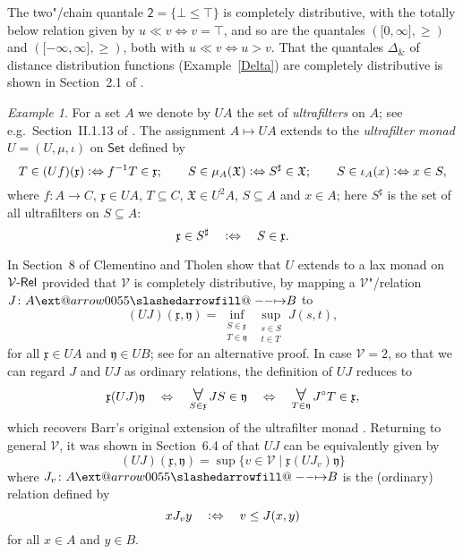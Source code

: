 \documentclass[preprint, a4paper]{elsarticle}
\makeatletter
\def\slashedarrowfill@#1#2#3#4#5{%
  $\m@th\thickmuskip0mu\medmuskip\thickmuskip\thinmuskip\thickmuskip
   \relax#5#1\mkern-7mu%
   \cleaders\hbox{$#5\mkern-2mu#2\mkern-2mu$}\hfill
   \mathclap{#3}\mathclap{#2}%
   \cleaders\hbox{$#5\mkern-2mu#2\mkern-2mu$}\hfill
   \mkern-7mu#4$%
}
\def\rightslashedarrowfill@{%
  \slashedarrowfill@\relbar\relbar\mapstochar\rightarrow}
\newcommand\xslashedrightarrow[2][]{%
  \ext@arrow 0055{\rightslashedarrowfill@}{#1}{#2}}
\def\slashedrightarrow{\xslashedrightarrow{}}
\theoremstyle{definition}
\theoremstyle{remark}
\newtheorem{example}[theorem]{Example}
\providecommand{\exref}[1]{Example~\ref{#1}}
\newcommand\defeq{\mathrel{\vcentcolon\Leftrightarrow}}
\renewcommand{\iff}{\Leftrightarrow}
\providecommand{\mf}[1]{\mathfrak{#1}}
\providecommand{\brcs}[1]{\lbrace #1 \rbrace}
\providecommand{\brks}[1]{\lbrack #1 \rbrack}
\providecommand{\set}[1]{\brcs{#1}}
\DeclareMathOperator\ForallOp{\mbox{\Large $\mathsurround0pt\forall$}}
\newcommand\Forall{\ForallOp\displaylimits}
\providecommand{\rev}[1]{#1^\circ}
\newcommand{\tn}{\mathbin\&}
\providecommand{\map}[3]{#1\colon#2\to#3}
\providecommand{\hmap}[3]{#1\colon#2\slashedrightarrow#3}
\providecommand{\inv}[1]{{#1}^{-1}}
\providecommand{\catvar}[1]{\mathcal{#1}}
\providecommand{\2}{\mathsf 2}
\providecommand{\V}{\catvar V}
\providecommand{\Set}{\mathsf{Set}}
\providecommand{\Rel}{\mathsf{Rel}}
\providecommand{\enRel}[1]{#1\text-\Rel}
\makeatother
\begin{document}
The two"/chain quantale $\2 = \set{\bot \leq \top}$ is completely distributive, with the totally below relation given by $u \ll v \iff v = \top$, and so are the quantales $(\brks{0, \infty}, \geq)$ and $(\brks{-\infty, \infty}, \geq)$, both with $u \ll v \iff u > v$. That the quantales $\Delta_{\tn}$ of distance distribution functions (\exref{Delta}) are completely distributive is shown in Section~2.1 of \cite{Hofmann-Reis13}.
	\begin{example} \label{ultrafilter monad}
		For a set $A$ we denote by $UA$ the set of \emph{ultrafilters} on $A$; see e.g.\ Section~II.1.13 of \cite{Hofmann-Seal-Tholen14}. The assignment $A \mapsto UA$ extends to the \emph{ultrafilter monad} $U = (U, \mu, \iota)$ on $\Set$ defined by
		\begin{displaymath}
			T \in (Uf)(\mf x) \defeq \inv f T \in \mf x; \qquad S \in \mu_A(\mf X) \defeq S^\sharp \in \mf X; \qquad S \in \iota_A(x) \defeq x \in S,
		\end{displaymath}
		where $\map fAC$, $\mf x \in UA$, $T \subseteq C$, $\mf X \in U^2A$, $S \subseteq A$ and $x \in A$; here $S^\sharp$ is the set of all ultrafilters on $S \subseteq A$:
		\begin{displaymath}
			\mf x \in S^\sharp \quad \defeq \quad S \in \mf x.
		\end{displaymath}
		
		In Section~8 of \cite{Clementino-Tholen03} Clementino and Tholen show that $U$ extends to a lax monad on $\enRel\V$ provided that $\V$ is completely distributive, by mapping a $\V$"/relation $\hmap JAB$ to
		\begin{displaymath}
			(UJ)(\mf x, \mf y) = \inf_{\substack{S \in \mf x \\ T \in \mf y}} \sup_{\substack{s \in S \\ t \in T}} J(s, t),
		\end{displaymath}
		for all $\mf x \in UA$ and $\mf y \in UB$; see \cite{Lai-Tholen17a} for an alternative proof. In case $\V = 2$, so that we can regard $J$ and $UJ$ as ordinary relations, the definition of $UJ$ reduces to
		\begin{displaymath}
			\mf x (UJ) \mf y \quad \iff \quad \Forall_{S \in \mf x} JS \in \mf y \quad \iff \quad \Forall_{T \in \mf y} \rev JT \in \mf x,
		\end{displaymath}
		which recovers Barr's original extension of the ultrafilter monad \cite{Barr70}. Returning to general $\V$, it was shown in Section~6.4 of \cite{Clementino-Hofmann04} that $UJ$ can be equivalently given by
		\begin{equation} \label{equivalent definition UJ}
			(UJ)(\mf x, \mf y) = \sup \set{v \in \V \mid \mf x (UJ_v) \mf y}
		\end{equation}
		where $\hmap{J_v}AB$ is the (ordinary) relation defined by
		\begin{displaymath}
			x J_v y \quad \defeq \quad v \leq J(x,y)
		\end{displaymath}
		for all $x \in A$ and $y \in B$.
		

\end{example}
\end{document}
